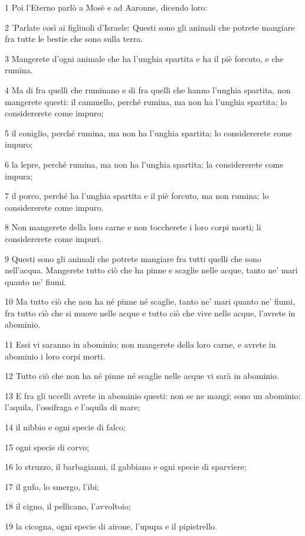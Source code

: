 \par 1 Poi l'Eterno parlò a Mosè e ad Aaronne, dicendo loro:
\par 2 'Parlate così ai figliuoli d'Israele: Questi sono gli animali che potrete mangiare fra tutte le bestie che sono sulla terra.
\par 3 Mangerete d'ogni animale che ha l'unghia spartita e ha il piè forcuto, e che rumina.
\par 4 Ma di fra quelli che ruminano e di fra quelli che hanno l'unghia spartita, non mangerete questi: il cammello, perché rumina, ma non ha l'unghia spartita; lo considererete come impuro;
\par 5 il coniglio, perché rumina, ma non ha l'unghia spartita; lo considererete come impuro;
\par 6 la lepre, perché rumina, ma non ha l'unghia spartita; la considererete come impura;
\par 7 il porco, perché ha l'unghia spartita e il piè forcuto, ma non rumina; lo considererete come impuro.
\par 8 Non mangerete della loro carne e non toccherete i loro corpi morti; li considererete come impuri.
\par 9 Questi sono gli animali che potrete mangiare fra tutti quelli che sono nell'acqua. Mangerete tutto ciò che ha pinne e scaglie nelle acque, tanto ne' mari quanto ne' fiumi.
\par 10 Ma tutto ciò che non ha né pinne né scaglie, tanto ne' mari quanto ne' fiumi, fra tutto ciò che si muove nelle acque e tutto ciò che vive nelle acque, l'avrete in abominio.
\par 11 Essi vi saranno in abominio; non mangerete della loro carne, e avrete in abominio i loro corpi morti.
\par 12 Tutto ciò che non ha né pinne né scaglie nelle acque vi sarà in abominio.
\par 13 E fra gli uccelli avrete in abominio questi: non se ne mangi; sono un abominio: l'aquila, l'ossifraga e l'aquila di mare;
\par 14 il nibbio e ogni specie di falco;
\par 15 ogni specie di corvo;
\par 16 lo struzzo, il barbagianni, il gabbiano e ogni specie di sparviere;
\par 17 il gufo, lo smergo, l'ibi;
\par 18 il cigno, il pellicano, l'avvoltoio;
\par 19 la cicogna, ogni specie di airone, l'upupa e il pipistrello.
